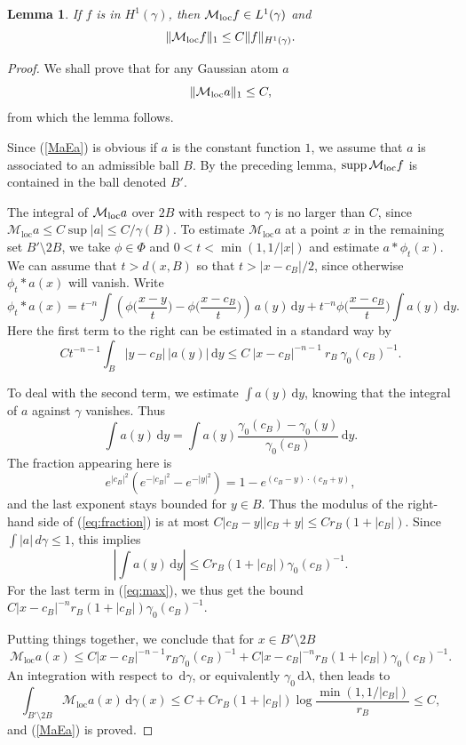\documentclass{amsart}                 %
\newtheorem{lemma}[theorem]{Lemma}
\numberwithin{equation}{section}
\renewcommand\mod[1]{\left\vert{#1}\right\vert}
\newcommand\norm[2]{{\Vert{#1}\Vert_{#2}}}
\newcommand\wrt{\,\mathrm{d}}
\newcommand\1{{\bf 1}}
\newcommand\cM{\mathcal{M}}  \newcommand\fM{\mathfrak{M}}
\newcommand\mlo {\cM_{\textnormal{loc}}}
\newcommand\ga{\gamma}    \newcommand\Ga{\Gamma}
\newcommand\huat[1]{H^1(#1)}
\newcommand\supp{\mathrm{supp}\,}
\begin{document}
\begin{lemma}\label{necn} If $f$ is  in $\huat{\gamma}$, then $
\mlo f\in L^1(\gamma)$ and
\[
 \norm{\mlo f}{1}\le C\norm{ f}{H^1(\ga)}.
\]
\end{lemma}
\begin{proof}
We shall prove that for any Gaussian
atom  $a$ 
\begin{equation}\label{MaEa}
\norm{\mlo a}{1}\le C, 
\end{equation}
from which the lemma follows.
\par
Since (\ref{MaEa}) is obvious if $a$ is the constant function $1$,
we assume that $a$ is  associated to an admissible ball $B$. 
By the preceding lemma, $\supp \mlo f$ is contained in the ball denoted $B'$.
\par
The integral of $\mlo a$ over $2B$ with respect 
to $\ga$ is no larger
than $C$, since 
$\mathcal{M}_{\mathrm{loc}}a \le C \sup |a| \le C/\gamma(B)$. To estimate
$\mathcal{M}_{\mathrm{loc}}a$ at a point $x$ in the remaining set
$B'\setminus 2B$, we take $\phi \in \Phi$ and $0 < t < \min(1,1/\mod{x})$
and estimate $a*\phi_t(x)$.
We can assume that $t > d(x, B)$ so that $t > |x-c_B|/2$, since 
otherwise  $\phi_t*a(x)$ will vanish. Write
\begin{equation}
  \label{eq:max}
 \phi_t*a(x) = t^{-n} \int  \left(\phi\big(\frac{x-y}t\big) -\phi\big( \frac{x-c_B}t\big)\right)\,a(y)
\wrt y +   t^{-n} \phi\big( \frac{x-c_B}t\big) \int a(y) \wrt y.  
\end{equation}
Here the first term to the right can be estimated in a standard way by
$$
C t^{-n-1}  \int_B  |y-c_B| \, |a(y)| \wrt y \le C\  |x-c_B|^{-n-1}\  r_B\  \ga_0(c_B)^{-1}.
$$

To deal with the second term, we estimate $\int a(y)\wrt y$, knowing that
the integral of $a$ against $\ga$ vanishes. Thus
$$
\int a(y)\wrt y = \int a(y) \frac{\ga_0(c_B) - \ga_0(y)}{\ga_0(c_B)}\wrt y.
$$
The fraction appearing here is
\begin{equation}
  \label{eq:fraction}
e^{|c_B|^2}\left(e^{-|c_B|^2} - e^{-|y|^2}\right) 
= 1 - e^{(c_B-y)\cdot(c_B+y)},
\end{equation}
and the last exponent stays bounded for $y \in B$. Thus  
the modulus of the right-hand side of (\ref{eq:fraction}) is
 at most $C|c_B-y| |c_B+y| \le C r_B (1+|c_B|).$ 
Since $\int |a|\,d\ga \le 1$, this implies
\[
|\int a(y)\wrt y| \le  C r_B (1+|c_B|) \ga_0(c_B)^{-1}.
\]
 For the
last term in (\ref{eq:max}), we thus get the bound 
$C |x-c_B|^{-n} r_B (1+|c_B|) \ga_0(c_B)^{-1}$.

Putting things together, we conclude that for $x \in B'\setminus 2B$
$$
\mathcal{M}_{\mathrm{loc}}a(x) \le  C |x-c_B|^{-n-1} r_B \ga_0(c_B)^{-1}
+  C |x-c_B|^{-n} r_B (1+|c_B|) \ga_0(c_B)^{-1}.
$$
An integration   with respect to $\wrt \ga$, or 
equivalently $\ga_0 \wrt \lambda$,
then leads to
$$
\int_{B'\setminus 2B} \mathcal{M}_{\mathrm{loc}}a(x)\wrt \ga(x) 
\le C + C r_B (1+|c_B|) \log\frac{\min(1,1/|c_B|)}{r_B} \le C,
$$ 
and  (\ref{MaEa}) is proved.
\end{proof} 
\end{document}
